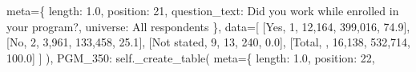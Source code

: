 \documentclass[
  11pt,
  a4paper,
]{article}
\newenvironment{Shaded}{\begin{snugshade}}{\end{snugshade}}
\newcommand{\NormalTok}[1]{\textcolor[rgb]{0.00,0.23,0.31}{#1}}
\newcommand{\OperatorTok}[1]{\textcolor[rgb]{0.37,0.37,0.37}{#1}}
\newcommand{\StringTok}[1]{\textcolor[rgb]{0.13,0.47,0.30}{#1}}
\newcommand{\VariableTok}[1]{\textcolor[rgb]{0.07,0.07,0.07}{#1}}
\begin{document}
\begin{Shaded}
\begin{Highlighting}[]
\NormalTok{                meta}\OperatorTok{=}\NormalTok{\{}
                    \StringTok{\textquotesingle{}length\textquotesingle{}}\NormalTok{: }\StringTok{\textquotesingle{}1.0\textquotesingle{}}\NormalTok{, }\StringTok{\textquotesingle{}position\textquotesingle{}}\NormalTok{: }\StringTok{\textquotesingle{}21\textquotesingle{}}\NormalTok{,}
                    \StringTok{\textquotesingle{}question\_text\textquotesingle{}}\NormalTok{: }\StringTok{\textquotesingle{}Did you work while enrolled in your program?\textquotesingle{}}\NormalTok{,}
                    \StringTok{\textquotesingle{}universe\textquotesingle{}}\NormalTok{: }\StringTok{\textquotesingle{}All respondents\textquotesingle{}}
\NormalTok{                \},}
\NormalTok{                data}\OperatorTok{=}\NormalTok{[}
\NormalTok{                    [}\StringTok{\textquotesingle{}Yes\textquotesingle{}}\NormalTok{, }\StringTok{\textquotesingle{}1\textquotesingle{}}\NormalTok{, }\StringTok{\textquotesingle{}12,164\textquotesingle{}}\NormalTok{, }\StringTok{\textquotesingle{}399,016\textquotesingle{}}\NormalTok{, }\StringTok{\textquotesingle{}74.9\textquotesingle{}}\NormalTok{],}
\NormalTok{                    [}\StringTok{\textquotesingle{}No\textquotesingle{}}\NormalTok{, }\StringTok{\textquotesingle{}2\textquotesingle{}}\NormalTok{, }\StringTok{\textquotesingle{}3,961\textquotesingle{}}\NormalTok{, }\StringTok{\textquotesingle{}133,458\textquotesingle{}}\NormalTok{, }\StringTok{\textquotesingle{}25.1\textquotesingle{}}\NormalTok{],}
\NormalTok{                    [}\StringTok{\textquotesingle{}Not stated\textquotesingle{}}\NormalTok{, }\StringTok{\textquotesingle{}9\textquotesingle{}}\NormalTok{, }\StringTok{\textquotesingle{}13\textquotesingle{}}\NormalTok{, }\StringTok{\textquotesingle{}240\textquotesingle{}}\NormalTok{, }\StringTok{\textquotesingle{}0.0\textquotesingle{}}\NormalTok{],}
\NormalTok{                    [}\StringTok{\textquotesingle{}Total\textquotesingle{}}\NormalTok{, }\StringTok{\textquotesingle{}\textquotesingle{}}\NormalTok{, }\StringTok{\textquotesingle{}16,138\textquotesingle{}}\NormalTok{, }\StringTok{\textquotesingle{}532,714\textquotesingle{}}\NormalTok{, }\StringTok{\textquotesingle{}100.0\textquotesingle{}}\NormalTok{]}
\NormalTok{                ]}
\NormalTok{            ),}
            \StringTok{\textquotesingle{}PGM\_350\textquotesingle{}}\NormalTok{: }\VariableTok{self}\NormalTok{.\_create\_table(}
\NormalTok{                meta}\OperatorTok{=}\NormalTok{\{}
                    \StringTok{\textquotesingle{}length\textquotesingle{}}\NormalTok{: }\StringTok{\textquotesingle{}1.0\textquotesingle{}}\NormalTok{, }\StringTok{\textquotesingle{}position\textquotesingle{}}\NormalTok{: }\StringTok{\textquotesingle{}22\textquotesingle{}}\NormalTok{,}

\end{Highlighting}
\end{Shaded}
\end{document}
